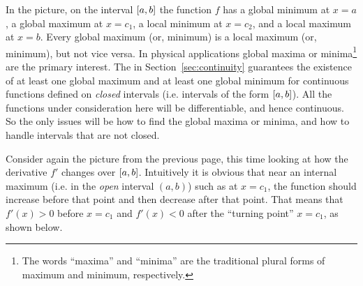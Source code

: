 \begin{center}\vspace{-14mm}
\end{center}\vspace{-2mm}
In the picture, on the
interval $\lbrack a,b \rbrack$ the function $f$ has a global minimum at $x=a$, a global
maximum at $x=c_1$, a local minimum at $x=c_2$, and a local maximum at $x=b$.
\newpage
Every global maximum (or, minimum) is a local maximum (or, minimum), but not vice versa.
In physical applications global maxima or minima\footnote{The words ``maxima''
and ``minima'' are the traditional plural forms of maximum and minimum,
respectively.} are the primary interest. The  in Section~\ref{sec:continuity} guarantees the
existence of at least one global maximum and at least one
global minimum for continuous functions defined on \emph{closed} intervals (i.e.
intervals of the form $\lbrack a,b \rbrack$). All the functions under consideration here
will be differentiable, and hence continuous. So the only issues will be how
to find the global maxima or minima, and how to handle intervals that are not
closed.

Consider again the picture from the previous page, this time looking at how
the derivative $f'$ changes over $\lbrack a,b \rbrack$. Intuitively it is obvious that
near an internal maximum (i.e. in the \emph{open} interval $(a,b)$) such as at
$x=c_1$, the function should increase before that point and then decrease after
that point. That means that $f'(x)>0$ before $x=c_1$ and $f'(x)<0$ after the
``turning point'' $x=c_1$, as shown below.

